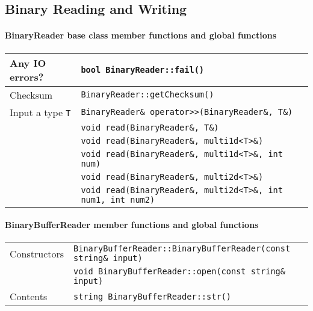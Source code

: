 \documentclass[12pt,letterpaper]{article}
\begin{document}
\newpage


\subsection{Binary Reading and Writing}
\label{sec:binaryio}

\paragraph{BinaryReader base class member functions and global functions}

\begin{flushleft}
  \begin{tabular}{|l|l|}
  \hline
  Any IO errors? & \verb|bool BinaryReader::fail()| \\
  \hline
  Checksum       & \verb|BinaryReader::getChecksum()|\\
  \hline
  Input a type \verb|T| & \verb|BinaryReader& operator>>(BinaryReader&, T&)| \\
                 & \verb|void read(BinaryReader&, T&)| \\
                 & \verb|void read(BinaryReader&, multi1d<T>&)| \\
                 & \verb|void read(BinaryReader&, multi1d<T>&, int num)| \\
                 & \verb|void read(BinaryReader&, multi2d<T>&)| \\
                 & \verb|void read(BinaryReader&, multi2d<T>&, int num1, int num2)| \\
  \hline
 \end{tabular}
\end{flushleft}

\paragraph{BinaryBufferReader member functions and global functions}

\begin{flushleft}
  \begin{tabular}{|l|l|}
  \hline
  Constructors   & \verb|BinaryBufferReader::BinaryBufferReader(const string& input)|\\
                 & \verb|void BinaryBufferReader::open(const string& input)|\\
  \hline
  Contents       & \verb|string BinaryBufferReader::str()|\\
  \hline
 \end{tabular}
\end{flushleft}
\end{document}
